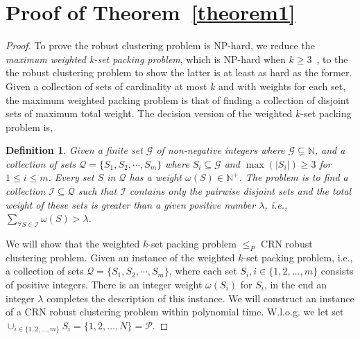 \documentclass[times]{ettauth}
\newcommand{\ie}{i.e., }
\theoremstyle{mytheoremstyle}
\theoremstyle{mytheoremstyle}
\theoremstyle{mytheoremstyle}
\newtheorem{mydef}{Definition}
\begin{document}
\section{Proof of Theorem~\ref{theorem1}}
\label{proof_theorem1}
\begin{proof}
To prove the robust clustering problem is NP-hard, we reduce the \textit{maximum weighted k-set packing problem}, which is NP-hard when $k\geqslant 3$~\cite{Computers_a_Intractability}, to the the robust clustering problem to show the latter is at least as hard as the former.
Given a collection of sets of cardinality at most $k$ and with weights for each set, the maximum weighted packing problem is that of finding a collection of disjoint sets of maximum total weight.
The decision version of the weighted $k$-set packing problem is,
\begin{mydef}
\label{def_kset_packing}
Given a finite set $\mathcal{G}$ of non-negative integers where $\mathcal{G} \subsetneq \mathbb{N}$, and a collection of sets $\mathcal{Q}=\{S_1,S_2,\cdots,S_m\}$ where $S_i \subseteq \mathcal{G}$ and $\max(|S_i|)\geq 3$ for $1 \leq i \leq m$.
Every set $S$ in $\mathcal{Q}$ has a weight $\omega(S) \in \mathbb{N}^+$. 
%
The problem is to find a collection $\mathcal{I} \subseteq \mathcal{Q}$ such that $\mathcal{I}$ contains only the pairwise disjoint sets and the total weight of these sets is greater than a given positive number $\lambda$, i.e., $\sum_{\forall S \in \mathcal{I}} \omega(S) > \lambda$.
\end{mydef}



We will show that the weighted $k$-set packing problem $\leq_P$ CRN robust clustering problem.
Given an instance of the weighted $k$-set packing problem, \ie a collection of sets $\mathcal{Q}=\{S_1,S_2,\cdots,S_m\}$, where each set $S_i, i\in \{1,2,\ldots,m\}$ consists of positive integers.
There is an integer weight $\omega(S_i)$ for $S_i$, in the end an integer $\lambda$ completes the description of this instance.
We will construct an instance of a CRN robust clustering problem within polynomial time.
W.l.o.g. we let set $\cup_{i\in\{1, 2,\ldots, m\}}S_i = \{ 1, 2,\ldots , N \} = \mathcal{P}$.


\end{proof}
\end{document}
